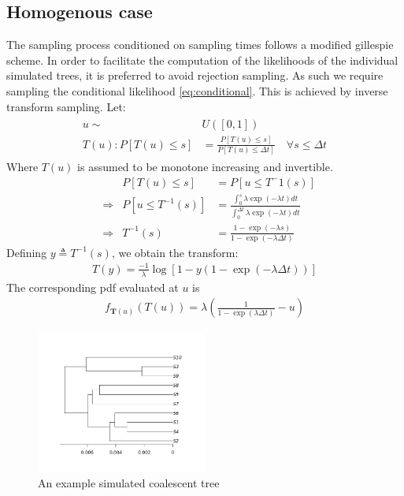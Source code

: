 \documentclass{article}
\theoremstyle{definition}
\begin{document}
\subsection{Homogenous case}
The sampling process conditioned on sampling times follows a modified gillespie scheme. In order to facilitate the computation of the likelihoods of the individual simulated trees, it is preferred to avoid rejection sampling. As such we require sampling the conditional likelihood \ref{eq:conditional}. This is achieved by inverse transform sampling.
Let:
\begin{gather}\label{eq:cond_timedep}
\begin{aligned}
  u\sim& U([0,1])\\
  T(u) : P[T(u)\leq s] &= \frac{P[T(u) \leq s]}{P[T(u) \leq \Delta t]} \quad\forall s \leq \Delta t
\end{aligned}
\end{gather}
Where $T(u)$ is assumed to be monotone increasing and invertible.
\begin{align*}
  &&P[T(u)\leq s] &= P[u\leq T^-1(s)]\\
  &\Rightarrow& P[u\leq T^{-1}(s)] &= \frac{\int_0^s\lambda\exp(-\lambda t)dt}{\int_0^{\Delta t}\lambda\exp(-\lambda t)dt}\\
  &\Rightarrow& T^{-1}(s) &= \frac{1-\exp(-\lambda s)}{1-\exp(-\lambda \Delta t)}
\end{align*}
Defining $y\triangleq T^{-1}(s)$, we obtain the transform:
\begin{gather}
T(y) = \frac{-1}{\lambda}\log[1-y(1-\exp(-\lambda\Delta t))]
\end{gather}
The corresponding pdf evaluated at $u$ is
\begin{gather}
f_{\mathbf{T}(u)}(T(u)) = \lambda \left(\frac{1}{1-\exp(\lambda\Delta t)}-u\right)
\end{gather}
\newpage
\begin{figure}[h]
  \centering
    \includegraphics[width=0.5\textwidth]{plots/Coalescent_Example.png}
    \caption{An example simulated coalescent tree}
\end{figure}
\end{document}
